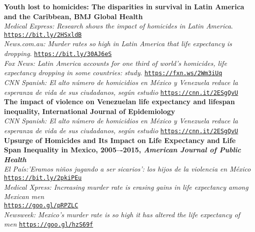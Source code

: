 \documentclass[12pt]{article}
\providecommand*\url[1]{\href{#1}{#1}}
\renewcommand*\url[1]{\href{#1}{\texttt{#1}}}
\begin{document}
\textbf{Youth lost to homicides: The disparities in survival in Latin America and the Caribbean, BMJ Global Health
}\\
\emph{Medical Express: Research shows the impact of homicides in Latin America}. \url{https://bit.ly/2HSxldB}\\
\emph{News.com.au: Murder rates so high in Latin America that life expectancy is dropping}. \url{https://bit.ly/30AJ6eS}\\
\emph{Fox News: Latin America accounts for one third of world's homicides, life expectancy dropping in some countries: study}. \url{https://fxn.ws/2Wm3iUq}\\
\emph{CNN Spanish: El alto n\'umero de homicidios en M\'exico y Venezuela reduce la esperanza de vida de sus ciudadanos, seg\'un estudio} \url{https://cnn.it/2ESgQvU}\\

\textbf{The impact of violence on Venezuelan life expectancy and lifespan inequality, International Journal of Epidemiology
}\\ 
\emph{CNN Spanish: El alto n\'umero de homicidios en M\'exico y Venezuela reduce la esperanza de vida de sus ciudadanos, seg\'un estudio} \url{https://cnn.it/2ESgQvU}\\



\textbf{Upsurge of Homicides and Its Impact on Life Expectancy and Life Span Inequality in Mexico, 2005–-2015, \emph{American Journal of Public Health}}\\
\emph{El Pa\'is:'Eramos ni\~nos jugando a ser sicarios': los hijos de la violencia en M\'exico }\\
\url{https://bit.ly/2pkiPEu}\\
\emph{ Medical Xpress: Increasing murder rate is erasing gains in life expectancy among Mexican men}\\ \url{https://goo.gl/pRPZLC}\\
\emph{ Newsweek: Mexico's murder rate is so high it has altered the life expectancy of men} \url{https://goo.gl/hzS69f}\\
\end{document}
